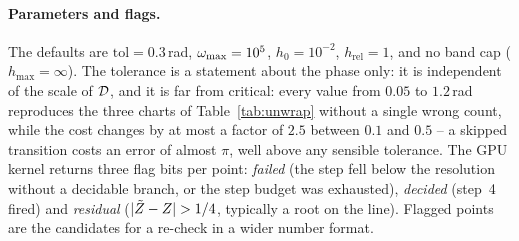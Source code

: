 \paragraph{Parameters and flags.} The defaults are $\mathrm{tol}=0.3$\,rad,
$\omega_{\mathrm{max}}=10^{5}$, $h_0=10^{-2}$, $h_{\mathrm{rel}}=1$, and no band cap
($h_{\max}=\infty$). The tolerance is a statement about the phase only: it is
independent of the scale of $\mathcal{D}$, and it is far from critical: every value
from $0.05$ to $1.2$\,rad reproduces the three charts of
Table~\ref{tab:unwrap} without a single wrong count, while the cost changes
by at most a factor of $2.5$ between $0.1$ and $0.5$ -- a skipped transition
costs an error of almost $\pi$, well above any sensible tolerance. The GPU kernel returns three flag bits per point: \emph{failed} (the
step fell below the resolution without a decidable branch, or the step budget
was exhausted), \emph{decided} (step~4 fired) and \emph{residual}
($|\Zraw-\Zint|>1/4$, typically a root on the line). Flagged points are the
candidates for a re-check in a wider number format.

